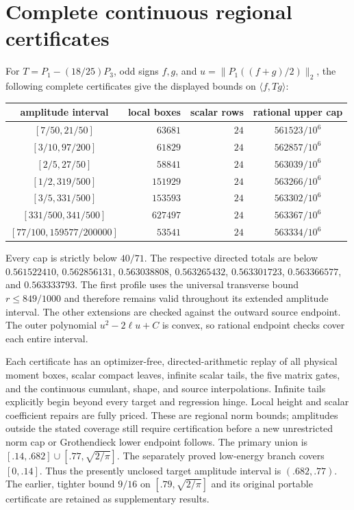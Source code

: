\documentclass[11pt]{article}
\begin{document}
\section{Complete continuous regional certificates}\label{app:regional}
For $T=P_1-(18/25)P_3$, odd signs $f,g$, and
$u=\|P_1((f+g)/2)\|_2$, the following complete certificates give
the displayed bounds on $\langle f,Tg\rangle$:
\begin{center}
\begin{tabular}{c|r|r|c}
amplitude interval & local boxes & scalar rows & rational upper cap\\ \hline
$[7/50,21/50]$ & $63681$ & $24$ & $561523/10^6$\\
$[3/10,97/200]$ & $61829$ & $24$ & $562857/10^6$\\
$[2/5,27/50]$ & $58841$ & $24$ & $563039/10^6$\\
$[1/2,319/500]$ & $151929$ & $24$ & $563266/10^6$\\
$[3/5,331/500]$ & $153593$ & $24$ & $563302/10^6$\\
$[331/500,341/500]$ & $627497$ & $24$ & $563367/10^6$\\
$[77/100,159577/200000]$ & $53541$ & $24$ & $563334/10^6$
\end{tabular}
\end{center}
Every cap is strictly below $40/71$.
The respective directed totals are below
$0.561522410$,
$0.562856131$, $0.563038808$, $0.563265432$,
$0.563301723$, $0.563366577$, and $0.563333793$.
The first profile uses the universal transverse bound $r\le849/1000$
and therefore remains valid throughout its extended amplitude interval.
The other extensions are checked against the outward source endpoint.
The outer polynomial $u^2-2\ell u+C$ is convex, so rational endpoint
checks cover each entire interval.

Each certificate has an optimizer-free, directed-arithmetic replay of
all physical moment boxes, scalar compact leaves, infinite scalar tails,
the five matrix gates, and the continuous cumulant, shape, and source
interpolations. Infinite tails explicitly begin beyond every target and
regression hinge. Local height and scalar coefficient repairs are fully
priced. These are regional norm bounds; amplitudes outside the stated
coverage still require certification before a new unrestricted norm cap
or Grothendieck lower endpoint follows.
The primary union is $[.14,.682]\cup[.77,\sqrt{2/\pi}]$.
The separately proved low-energy branch covers $[0,.14]$.
Thus the presently unclosed target amplitude interval is $(.682,.77)$.
The earlier, tighter bound $9/16$ on $[.79,\sqrt{2/\pi}]$ and its
original portable certificate are retained as supplementary results.
\end{document}
